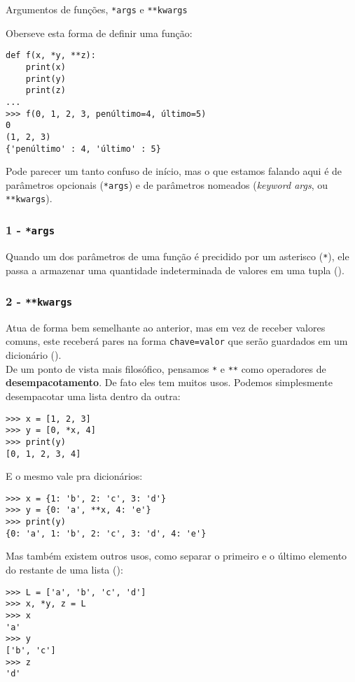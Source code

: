 \documentclass[12pt]{article}
\begin{document}
	\begin{interlude}{Argumentos de funções, \texttt{*args} e \texttt{**kwargs}}
	
	Oberseve esta forma de definir uma função:
	\begin{lstlisting}
def f(x, *y, **z):
	print(x)
	print(y)
	print(z)
...
>>> f(0, 1, 2, 3, penúltimo=4, último=5)
0
(1, 2, 3)
{'penúltimo' : 4, 'último' : 5}
	\end{lstlisting}
	
	Pode parecer um tanto confuso de início, mas o que estamos falando aqui é de parâmetros opcionais (\texttt{*args}) e de parâmetros nomeados (\textit{keyword args}, ou \texttt{**kwargs}).
	
	\subsubsection*{1 - \texttt{*args}}
	
	Quando um dos parâmetros de uma função é precidido por um asterisco (\texttt{*}), ele passa a armazenar uma quantidade indeterminada de valores em uma tupla ().
	
	\subsubsection*{2 - \texttt{**kwargs}}
	
	Atua de forma bem semelhante ao anterior, mas em vez de receber valores comuns, este receberá pares na forma \texttt{chave=valor} que serão guardados em um dicionário ().\\
	
	De um ponto de vista mais filosófico, pensamos \texttt{*} e \texttt{**} como operadores de \textbf{desempacotamento}. De fato eles tem muitos usos. Podemos simplesmente desempacotar uma lista dentro da outra:
	
	\begin{lstlisting}
>>> x = [1, 2, 3]
>>> y = [0, *x, 4]
>>> print(y)
[0, 1, 2, 3, 4]
	\end{lstlisting}
	
	E o mesmo vale pra dicionários:
	
	\begin{lstlisting}
>>> x = {1: 'b', 2: 'c', 3: 'd'}
>>> y = {0: 'a', **x, 4: 'e'}
>>> print(y)
{0: 'a', 1: 'b', 2: 'c', 3: 'd', 4: 'e'}
	\end{lstlisting}
	
	Mas também existem outros usos, como separar o primeiro e o último elemento do restante de uma lista ():
	
	\begin{lstlisting}
>>> L = ['a', 'b', 'c', 'd']
>>> x, *y, z = L
>>> x
'a'
>>> y
['b', 'c']
>>> z
'd' 
	\end{lstlisting}
	
	\end{interlude}
	
\end{document}
